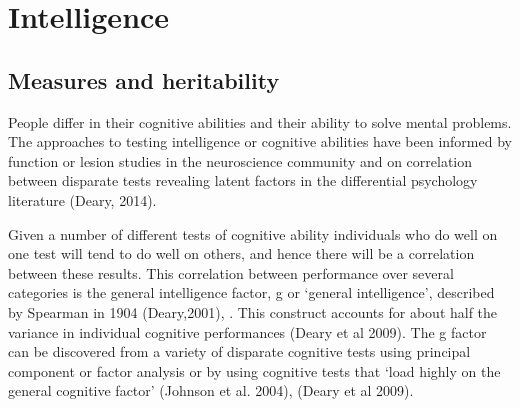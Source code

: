\section{Intelligence}

\subsection{Measures and heritability}

People differ in their cognitive abilities and their ability to solve mental problems. The approaches to testing intelligence or cognitive abilities have been informed by function or lesion studies in the neuroscience community and on correlation between disparate tests revealing latent factors in the differential psychology literature \cite{deary2014stability} (Deary, 2014).

Given a number of different tests of cognitive ability individuals who do well on one test will tend to do well on others, and hence there will be a correlation between these results. This correlation between performance over several categories is the general intelligence factor, g or ‘general intelligence’, described by Spearman in 1904  \cite{deary2001intelligence}(Deary,2001), \cite{deary2014stability}. This construct accounts for about half the variance in individual cognitive performances \cite{deary2009genetic}(Deary et al 2009). The g factor can be discovered from a variety of disparate cognitive tests using principal component or factor analysis or by using cognitive tests that ‘load highly on the general cognitive factor’ \cite{johnson2004just}(Johnson et al. 2004), \cite{deary2009genetic} (Deary et al 2009).

